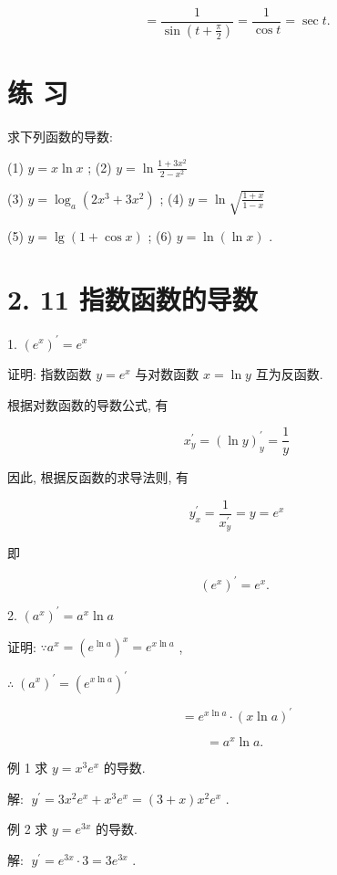 \documentclass[10pt]{article}
\begin{document}
\[
= \frac{1}{\sin \left( {t + \frac{\pi }{2}}\right) } = \frac{1}{\cos t} = \sec t.
\]

\section*{练 习}

求下列函数的导数:

(1) \(y = x\ln x\) ; (2) \(y = \ln \frac{1 + 3{x}^{2}}{2 - {x}^{2}}\)

(3) \(y = {\log }_{a}\left( {2{x}^{3} + 3{x}^{2}}\right)\) ; (4) \(y = \ln \sqrt{\frac{1 + x}{1 - x}}\)

(5) \(y = \lg \left( {1 + \cos x}\right)\) ; (6) \(y = \ln \left( {\ln x}\right)\) .

\section*{2. 11 指数函数的导数}

1. \({\left( {e}^{x}\right) }^{\prime } = {e}^{x}\)

证明: 指数函数 \(y = {e}^{x}\) 与对数函数 \(x = \ln y\) 互为反函数.

根据对数函数的导数公式, 有

\[
{x}_{y}^{\prime } = {\left( \ln y\right) }_{y}^{\prime } = \frac{1}{y}
\]

因此, 根据反函数的求导法则, 有

\[
{y}_{x}^{\prime } = \frac{1}{{x}_{y}^{\prime }} = y = {e}^{x}
\]

即

\[
{\left( {e}^{x}\right) }^{\prime } = {e}^{x}\text{. }
\]

2. \({\left( {a}^{x}\right) }^{\prime } = {a}^{x}\ln a\)

证明: \(\because {a}^{x} = {\left( {e}^{\ln a}\right) }^{x} = {e}^{x\ln a}\) ,

\(\therefore \;{\left( {a}^{x}\right) }^{\prime } = {\left( {e}^{x\ln a}\right) }^{\prime }\)

\[
= {e}^{x\ln a} \cdot {\left( x\ln a\right) }^{\prime }
\]

\[
= {a}^{x}\ln a\text{. }
\]

例 1 求 \(y = {x}^{3}{e}^{x}\) 的导数.

解: \(\;{y}^{\prime } = 3{x}^{2}{e}^{x} + {x}^{3}{e}^{x} = \left( {3 + x}\right) {x}^{2}{e}^{x}\) .

例 2 求 \(y = {e}^{3x}\) 的导数.

解: \(\;{y}^{\prime } = {e}^{3x} \cdot 3 = 3{e}^{3x}\) .
\end{document}
